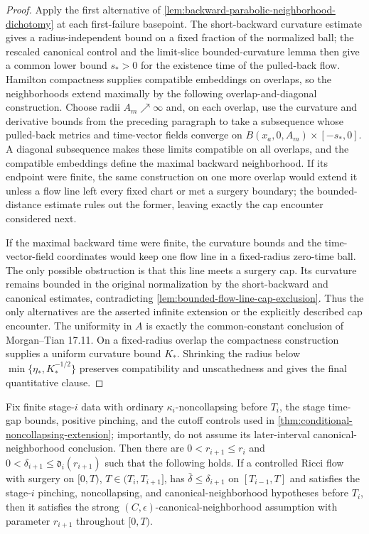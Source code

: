 \begin{proof}
Apply the first alternative of
\ref{lem:backward-parabolic-neighborhood-dichotomy} at each first-failure
basepoint.  The short-backward curvature estimate gives a radius-independent
bound on a fixed fraction of the normalized ball; the rescaled canonical
control and the limit-slice bounded-curvature lemma then give a common lower
bound $s_*>0$ for the existence time of the pulled-back flow.  Hamilton
compactness supplies compatible embeddings on overlaps, so the neighborhoods
extend maximally by the following overlap-and-diagonal construction.  Choose
radii $A_m\nearrow\infty$ and, on each overlap, use the curvature and
derivative bounds from the preceding paragraph to take a subsequence whose
pulled-back metrics and time-vector fields converge on
$B(x_a,0,A_m)\times[-s_*,0]$.  A diagonal subsequence makes these limits
compatible on all overlaps, and the compatible embeddings define the maximal
backward neighborhood.  If its endpoint were finite, the same construction
on one more overlap would extend it unless a flow line left every fixed chart
or met a surgery boundary; the bounded-distance estimate rules out the
former, leaving exactly the cap encounter considered next.

If the maximal backward time were finite, the curvature bounds and the
time-vector-field coordinates would keep one flow line in a fixed-radius
zero-time ball.  The only possible obstruction is that this line meets a
surgery cap.  Its curvature remains bounded in the original normalization by
the short-backward and canonical estimates, contradicting
\ref{lem:bounded-flow-line-cap-exclusion}.  Thus the only alternatives are
the asserted infinite extension or the explicitly described cap encounter.
  The uniformity in $A$ is exactly the common-constant conclusion of Morgan--Tian
17.11.  On a fixed-radius overlap the compactness construction supplies a
uniform curvature bound $K_*$.  Shrinking the radius below
$\min\{\eta_*,K_*^{-1/2}\}$ preserves compatibility and unscathedness and
gives the final quantitative clause.
\end{proof}

\begin{theorem}
\label{thm:strong-canonical-neighborhood-extension}
\notready
Fix finite stage-$i$ data with ordinary $\kappa_i$-noncollapsing before
$T_i$, the stage time-gap bounds, positive pinching, and the cutoff controls
used in \ref{thm:conditional-noncollapsing-extension}; importantly, do not
assume its later-interval canonical-neighborhood conclusion.  Then there are
$0<r_{i+1}\le r_i$ and
$0<\delta_{i+1}\le\mathfrak d_i(r_{i+1})$ such that the following holds.  If a
controlled Ricci flow with surgery on $[0,T)$,
$T\in(T_i,T_{i+1}]$, has $\bar\delta\le\delta_{i+1}$ on
$[T_{i-1},T]$ and satisfies the stage-$i$ pinching, noncollapsing, and
canonical-neighborhood hypotheses before $T_i$, then it satisfies the strong
$(C,\epsilon)$-canonical-neighborhood assumption with parameter
$r_{i+1}$ throughout $[0,T)$.
\end{theorem}

